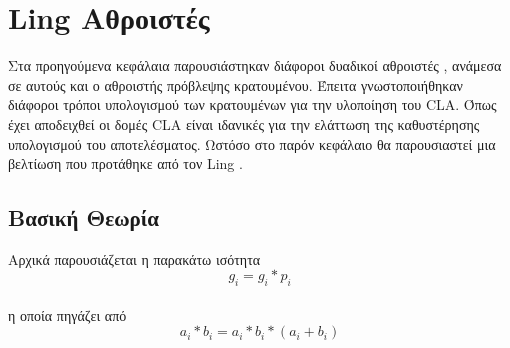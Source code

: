 \section{Ling Αθροιστές}
\label{section:Ling}
Στα προηγούμενα κεφάλαια παρουσιάστηκαν διάφοροι δυαδικοί αθροιστές , 
ανάμεσα σε αυτούς και ο αθροιστής πρόβλεψης κρατουμένου. Έπειτα γνωστοποιήθηκαν 
διάφοροι τρόποι υπολογισμού των κρατουμένων για την υλοποίηση του CLA. Όπως
έχει αποδειχθεί οι δομές CLA είναι ιδανικές για την ελάττωση της καθυστέρησης υπολογισμού
του αποτελέσματος. Ωστόσο στο παρόν κεφάλαιο θα παρουσιαστεί μια βελτίωση που προτάθηκε 
από τον Ling \cite{5390638} .



\subsection{Βασική Θεωρία}

Αρχικά παρουσιάζεται η παρακάτω ισότητα 
\begin{equation}
    g_i = g_i*p_i
\end{equation}
\\
η οποία πηγάζει από 
\begin{equation*}
    a_i * b_i = a_i * b_i * (a_i + b_i)
\end{equation*}

